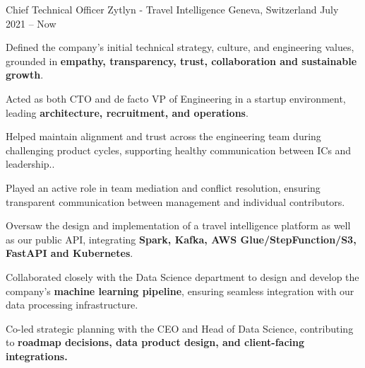 

\begin{cventries}

\cventry
  {Chief Technical Officer} %
  {Zytlyn - Travel Intelligence} %
  {Geneva, Switzerland} %
  {July 2021 – Now} %
  {
    \begin{cvitems} %
      \item {Defined the company's initial technical strategy, culture, and engineering values, grounded in \textbf{empathy, transparency, trust, collaboration and sustainable growth}.}
      \item {Acted as both CTO and de facto VP of Engineering in a startup environment, leading \textbf{architecture, recruitment, and operations}.}
      \item {Helped maintain alignment and trust across the engineering team during challenging product cycles, supporting healthy communication between ICs and leadership..}
      \item {Played an active role in team mediation and conflict resolution, ensuring transparent communication between management and individual contributors.}
      \item {Oversaw the design and implementation of a travel intelligence platform as well as our public API, integrating \textbf{Spark, Kafka, AWS Glue/StepFunction/S3, FastAPI and Kubernetes}.}
      \item {Collaborated closely with the Data Science department to design and develop the company's \textbf{machine learning pipeline}, ensuring seamless integration with our data processing infrastructure.}
      \item {Co-led strategic planning with the CEO and Head of Data Science, contributing to \textbf{roadmap decisions, data product design, and client-facing integrations.}}
    \end{cvitems}
  }


\end{cventries}
